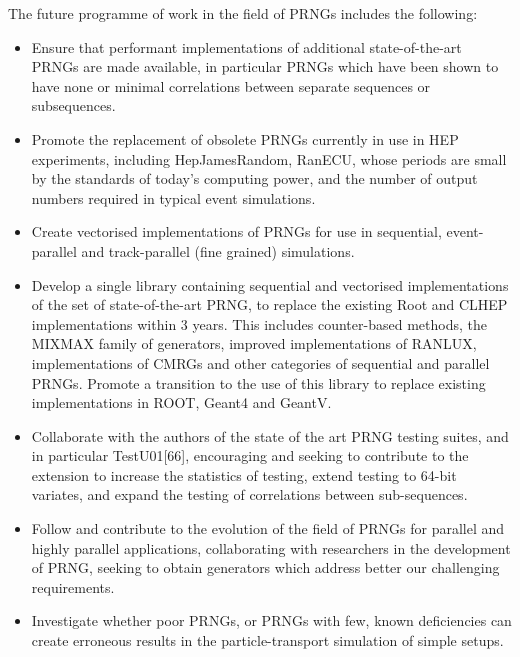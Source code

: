 \documentclass[12pt,a4paper]{article}
\begin{document}
The future programme of work in the field of PRNGs includes the
following:

\begin{itemize}
\item
  Ensure that performant implementations of additional state-of-the-art
  PRNGs are made available, in particular PRNGs which have been shown to
  have none or minimal correlations between separate sequences or
  subsequences.
\item
  Promote the replacement of obsolete PRNGs currently in use in HEP
  experiments, including HepJamesRandom, RanECU, whose periods are small
  by the standards of today's computing power, and the number of output
  numbers required in typical event simulations.
\item
  Create vectorised implementations of PRNGs for use in sequential,
  event-parallel and track-parallel (fine grained) simulations.
\item
  Develop a single library containing sequential and vectorised
  implementations of the set of state-of-the-art PRNG, to replace the
  existing Root and CLHEP implementations within 3 years. This includes
  counter-based methods, the MIXMAX family of generators, improved
  implementations of RANLUX, implementations of CMRGs and other
  categories of sequential and parallel PRNGs. Promote a transition to
  the use of this library to replace existing implementations in ROOT,
  Geant4 and GeantV.
\item
  Collaborate with the authors of the state of the art PRNG testing
  suites, and in particular TestU01{[}66{]}, encouraging and seeking to
  contribute to the extension to increase the statistics of testing,
  extend testing to 64-bit variates, and expand the testing of
  correlations between sub-sequences.
\item
  Follow and contribute to the evolution of the field of PRNGs for
  parallel and highly parallel applications, collaborating with
  researchers in the development of PRNG, seeking to obtain generators
  which address better our challenging requirements.
\end{itemize}

\begin{itemize}
\item
  Investigate whether poor PRNGs, or PRNGs with few, known deficiencies
  can create erroneous results in the particle-transport simulation of
  simple setups.
\end{itemize}

\hypertarget{section-7}{%
\section{}\label{section-7}}
\end{document}
